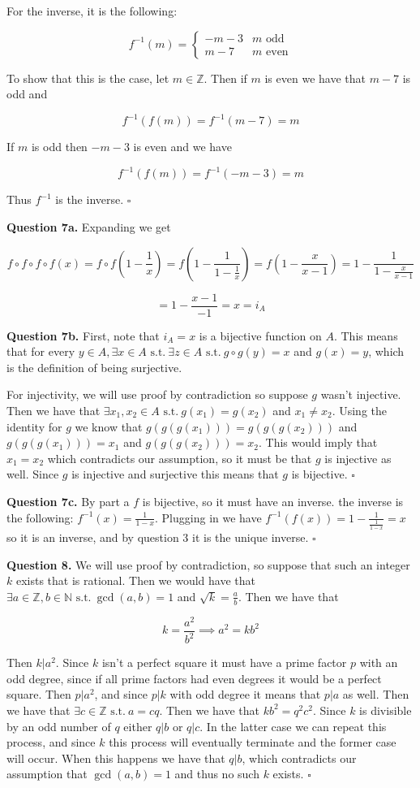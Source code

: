 \documentclass[letterpaper, reqno,11pt]{article}
\newcommand{\ZZ}{\mathbb{Z}}
\newcommand{\NN}{\mathbb{N}}
\newcommand{\st}{\text{ s.t.}\ }
\begin{document}
For the inverse, it is the following: 

\[
    f^{-1}(m)=\begin{cases}-m-3&m\text{ odd}\\m-7&m\text{ even}\end{cases}    
\]

To show that this is the case, let $m\in\ZZ$. Then if $m$ is even we have that $m-7$ is odd and

\[
    f^{-1}(f(m))=f^{-1}(m-7)=m
\]

If $m$ is odd then $-m-3$ is even and we have 

    
\[
    f^{-1}(f(m))=f^{-1}(-m-3)=m
\]

Thus $f^{-1}$ is the inverse. $\square$

{\noindent\bf Question 7a.} Expanding we get 

\[
    f\circ f\circ f\circ f(x)=f\circ f(1-\frac1x)=f(1-\frac1{1-\frac1x})=f(1-\frac x{x-1})=1-\frac1{1-\frac x{x-1}}
\]

\[
    =1-\frac{x-1}{-1}=x=i_A
\]

{\noindent\bf Question 7b.} First, note that $i_A=x$ is a bijective function on $A$. This means that for every $y\in A, \exists x\in A\st \exists z\in A\st g\circ g(y)=x$ and $g(x)=y$, which is the definition of being surjective. 

For injectivity, we will use proof by contradiction so suppose $g$ wasn't injective. Then we have that $\exists x_1, x_2\in A\st g(x_1)=g(x_2)$ and $x_1\neq x_2$. Using the identity for $g$ we know that $g(g(g(x_1)))=g(g(g(x_2)))$ and $g(g(g(x_1)))=x_1$ and $g(g(g(x_2)))=x_2$. This would imply that $x_1=x_2$ which contradicts our assumption, so it must be that $g$ is injective as well. Since $g$ is injective and surjective this means that $g$ is bijective. $\square$

{\noindent\bf Question 7c.} By part a $f$ is bijective, so it must have an inverse. the inverse is the following: $f^{-1}(x)=\frac1{1-x}$. Plugging in we have $f^{-1}(f(x))=1-\frac1{\frac1{1-x}}=x$ so it is an inverse, and by question 3 it is the unique inverse. $\square$

{\noindent\bf Question 8.} We will use proof by contradiction, so suppose that such an integer $k$ exists that is rational. Then we would have that $\exists a\in\ZZ, b\in\NN\st \gcd(a, b)=1$ and $\sqrt k=\frac ab$. Then we have that 

\[
    k=\frac{a^2}{b^2}\implies a^2=kb^2
\]

Then $k|a^2$. Since $k$ isn't a perfect square it must have a prime factor $p$ with an odd degree, since if all prime factors had even degrees it would be a perfect square. Then $p|a^2$, and since $p|k$ with odd degree it means that $p|a$ as well. Then we have that $\exists c\in \ZZ\st a=cq$. Then we have that $kb^2=q^2c^2$. Since $k$ is divisible by an odd number of $q$ either $q|b$ or $q|c$. In the latter case we can repeat this process, and since $k$ this process will eventually terminate and the former case will occur. When this happens we have that $q|b$, which contradicts our assumption that $\gcd(a, b)=1$ and thus no such $k$ exists. $\square$
\end{document}
